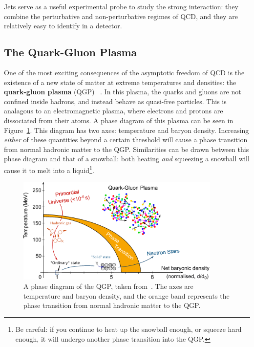 Jets serve as a useful experimental probe to study the strong interaction: they combine the perturbative and non-perturbative regimes of QCD, and they are relatively easy to identify in a detector.

\subsection{The Quark-Gluon Plasma}
\label{sec:qgp}

One of the most exciting consequences of the asymptotic freedom of QCD is the existence of a new state of matter at extreme temperatures and densities: the \textbf{quark-gluon plasma} (QGP) ~\cite{QGP1, QGP2}. In this plasma, the quarks and gluons are not confined inside hadrons, and instead behave as quasi-free particles. This is analagous to an electromagnetic plasma, where electrons and protons are dissociated from their atoms. A phase diagram of this plasma can be seen in Figure~\ref{fig:qgp_phase_diagram}. This diagram has two axes: temperature and baryon density. Increasing \textit{either} of these quantities beyond a certain threshold will cause a phase transition from normal hadronic matter to the QGP. Similarities can be drawn between this phase diagram and that of a snowball: both heating \textit{and} squeezing a snowball will cause it to melt into a liquid\footnote{Be careful: if you continue to heat up the snowball enough, or squeeze hard enough, it will undergo another phase transition into the QGP.}.

\begin{figure}
    \centering
    \includegraphics[width=0.9\textwidth]{figures/introduction/qgp_phase_diagram.png}
    \caption{A phase diagram of the QGP, taken from~\cite{QGPPhaseDiagram}. The axes are temperature and baryon density, and the orange band represents the phase transition from normal hadronic matter to the QGP.}
    \label{fig:qgp_phase_diagram}
\end{figure}

